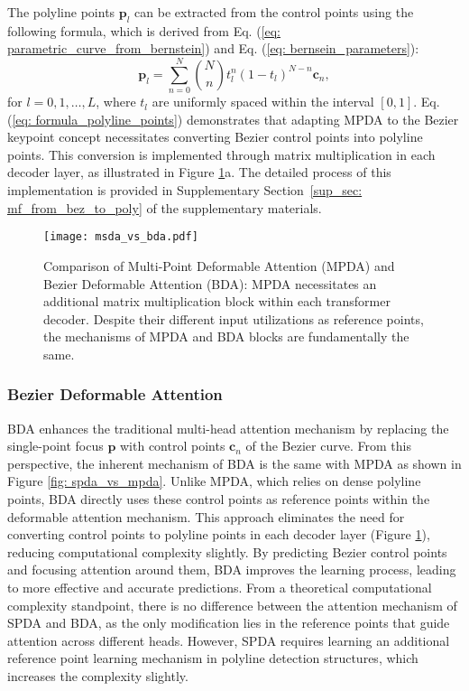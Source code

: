 The polyline points \( \mathbf{p}_l \) can be extracted from the control points using the following formula, which is derived from Eq. (\ref{eq: parametric_curve_from_bernstein}) and Eq. (\ref{eq: bernsein_parameters}):
\begin{equation}
\mathbf{p}_l = \sum_{n=0}^{N} \binom{N}{n} t_l^n (1 - t_l)^{N-n} \mathbf{c}_n,
\label{eq: formula_polyline_points}
\end{equation}
for \( l = 0, 1, \ldots, L \), where \( t_l \) are uniformly spaced within the interval \([0, 1]\). Eq. (\ref{eq: formula_polyline_points}) demonstrates that adapting MPDA to the Bezier keypoint concept necessitates converting Bezier control points into polyline points. This conversion is implemented through matrix multiplication in each decoder layer, as illustrated in Figure \ref{fig: msda_vs_bda}a. The detailed process of this implementation is provided in Supplementary Section~\ref{sup_sec: mf_from_bez_to_poly} of the supplementary materials.

\begin{figure}[tb]
  \centering
  \texttt{[image: msda\_vs\_bda.pdf]}
  \caption{Comparison of Multi-Point Deformable Attention (MPDA) and Bezier Deformable Attention (BDA): MPDA necessitates an additional matrix multiplication block within each transformer decoder. Despite their different input utilizations as reference points, the mechanisms of MPDA and BDA blocks are fundamentally the same.}
  \label{fig: msda_vs_bda}
\end{figure}

\subsubsection{Bezier Deformable Attention}

BDA enhances the traditional multi-head attention mechanism by replacing the single-point focus \( \mathbf{p} \) with control points \( \mathbf{c}_n \) of the Bezier curve. From this perspective, the inherent mechanism of BDA is the same with MPDA as shown in Figure \ref{fig: spda_vs_mpda}. Unlike MPDA, which relies on dense polyline points, BDA directly uses these control points as reference points within the deformable attention mechanism. This approach eliminates the need for converting control points to polyline points in each decoder layer (Figure \ref{fig: msda_vs_bda}), reducing computational complexity slightly. By predicting Bezier control points and focusing attention around them, BDA improves the learning process, leading to more effective and accurate predictions. From a theoretical computational complexity standpoint, there is no difference between the attention mechanism of SPDA and BDA, as the only modification lies in the reference points that guide attention across different heads. However, SPDA requires learning an additional reference point learning mechanism in polyline detection structures, which increases the complexity slightly.  


